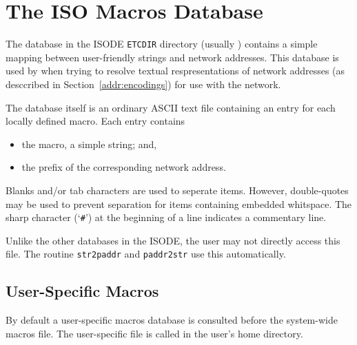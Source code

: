 
\chapter	{The ISO Macros Database}\label{isomacros}
The database  in the ISODE \verb"ETCDIR" directory
(usually )
contains a simple mapping between
user-friendly strings and network addresses.
This database is used by when trying to resolve textual respresentations of
network addresses
(as desccribed in Section~\ref{addr:encodings}) for use with the network.

The database itself is an ordinary ASCII text file containing an entry for
each locally defined macro.
Each entry contains
\begin{itemize}
\item	the macro, a simple string; and,

\item	the prefix of the corresponding network address.
\end{itemize}
Blanks and/or tab characters are used to seperate items.
However, double-quotes may be used to prevent separation for items containing
embedded whitspace.
The sharp character (`\verb"#"') at the beginning of a line indicates a
commentary line.

Unlike the other databases in the ISODE,
the user may not directly access this file.
The routine \verb"str2paddr" and \verb"paddr2str" use this automatically.

\section	{User-Specific Macros}
By default a user-specific macros database is consulted before the
system-wide macros file.
The user-specific file is called  in the user's
home directory.
